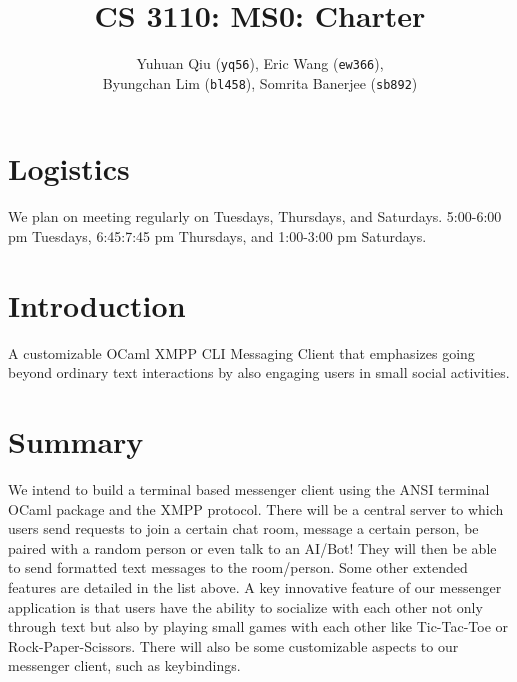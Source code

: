 \documentclass[a4paper]{article}
\title{
    \vspace{-4.0cm}
	CS 3110: MS0: Charter
}
\author{
	Yuhuan Qiu (\texttt{yq56}),
	Eric Wang (\texttt{ew366}),
    \\Byungchan Lim (\texttt{bl458}),
	Somrita Banerjee (\texttt{sb892})
}
\begin{document}
\maketitle

\section{Logistics}

We plan on meeting regularly on Tuesdays, Thursdays, and Saturdays.
5:00-6:00 pm Tuesdays,
6:45:7:45 pm Thursdays, and
1:00-3:00 pm Saturdays.

\section{Introduction}

A customizable OCaml XMPP CLI Messaging Client that emphasizes going beyond
ordinary text interactions by also engaging users in small social activities.

\section{Summary}

We intend to build a terminal based messenger client using the ANSI terminal
OCaml package and the XMPP protocol. There will be a central server to which
users send requests to join a certain chat room, message a certain person, be
paired with a random person or even talk to an AI/Bot! They will then be able to
send formatted text messages to the room/person. Some other extended features
are detailed in the list above. A key innovative feature of our messenger
application is that users have the ability to socialize with each other not only
through text but also by playing small games with each other like Tic-Tac-Toe or
Rock-Paper-Scissors. There will also be some customizable aspects to our
messenger client, such as keybindings.
\end{document}
